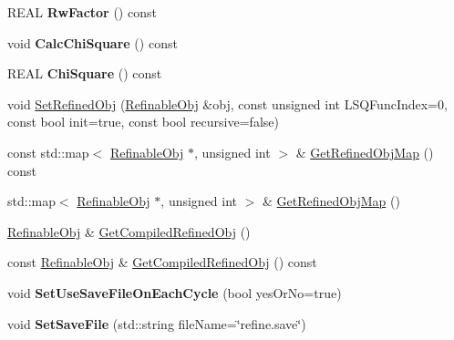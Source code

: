 \begin{DoxyCompactItemize}
R\+E\+AL {\bfseries Rw\+Factor} () const
\item 
\mbox{\label{class_obj_cryst_1_1_l_s_q_num_obj_aac385aa521db33e7949c899d1173637e}} 
void {\bfseries Calc\+Chi\+Square} () const
\item 
\mbox{\label{class_obj_cryst_1_1_l_s_q_num_obj_aeb993eb2d5321762809b8fc4b11eb2fc}} 
R\+E\+AL {\bfseries Chi\+Square} () const
\item 
void \mbox{\hyperlink{class_obj_cryst_1_1_l_s_q_num_obj_ac093bab1bcb43aa4ea00f63fdb53063f}{Set\+Refined\+Obj}} (\mbox{\hyperlink{class_obj_cryst_1_1_refinable_obj}{Refinable\+Obj}} \&obj, const unsigned int L\+S\+Q\+Func\+Index=0, const bool init=true, const bool recursive=false)
\item 
const std\+::map$<$ \mbox{\hyperlink{class_obj_cryst_1_1_refinable_obj}{Refinable\+Obj}} $\ast$, unsigned int $>$ \& \mbox{\hyperlink{class_obj_cryst_1_1_l_s_q_num_obj_a67a9441f00f93e3ca73b1cab404bf565}{Get\+Refined\+Obj\+Map}} () const
\item 
std\+::map$<$ \mbox{\hyperlink{class_obj_cryst_1_1_refinable_obj}{Refinable\+Obj}} $\ast$, unsigned int $>$ \& \mbox{\hyperlink{class_obj_cryst_1_1_l_s_q_num_obj_a8dcad64f6e47e1722ba6946f879cdaa4}{Get\+Refined\+Obj\+Map}} ()
\item 
\mbox{\hyperlink{class_obj_cryst_1_1_refinable_obj}{Refinable\+Obj}} \& \mbox{\hyperlink{class_obj_cryst_1_1_l_s_q_num_obj_ac3f32c7adf83c788c43c16c07ad00630}{Get\+Compiled\+Refined\+Obj}} ()
\item 
const \mbox{\hyperlink{class_obj_cryst_1_1_refinable_obj}{Refinable\+Obj}} \& \mbox{\hyperlink{class_obj_cryst_1_1_l_s_q_num_obj_a6ddb54f933db8da5d006ed964a96fa94}{Get\+Compiled\+Refined\+Obj}} () const
\item 
\mbox{\label{class_obj_cryst_1_1_l_s_q_num_obj_a5052fda0d9764bf06f985ec9443fa145}} 
void {\bfseries Set\+Use\+Save\+File\+On\+Each\+Cycle} (bool yes\+Or\+No=true)
\item 
\mbox{\label{class_obj_cryst_1_1_l_s_q_num_obj_a62fe3d8067ee765448a0042a9a34bf2f}} 
void {\bfseries Set\+Save\+File} (std\+::string file\+Name=\char`\"{}refine.\+save\char`\"{})
\item 
\mbox{\label{class_obj_cryst_1_1_l_s_q_num_obj_a590576091aa956f5451380a4e4fbdf56}} 

\end{DoxyCompactItemize}

